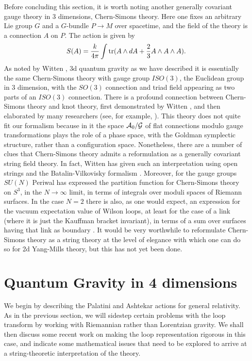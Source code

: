 \documentclass[12pt]{article}
\newcommand{\A}{{\cal A}}
\newcommand{\G}{{\cal G}}
\newcommand{\tr}{{\rm tr}}
\begin{document}
Before concluding this section,
it is worth noting another generally covariant gauge theory in 3 dimensions,
Chern-Simons theory.  Here one fixes an arbitrary Lie group $G$
and a $G$-bundle $P \to M$ over
spacetime, and the field of the theory
is a connection $A$ on $P$.  The action is given by
\[           S(A) = {k\over 4\pi}
 \int \tr(A \wedge dA + {2\over 3}A \wedge A \wedge A)  .\]
As noted by
Witten \cite{Witten2},  3d quantum gravity as we have described it is
essentially the same Chern-Simons theory with gauge group $ISO(3)$, the
Euclidean group in 3 dimension, with the $SO(3)$ connection and triad field
appearing as two parts of an $ISO(3)$ connection.  There is a profound
connection between Chern-Simons theory and knot theory, first demonstrated
by Witten \cite{Witten}, and then elaborated by many researchers (see, for
example, \cite{Atiyah}).  This theory does not quite fit our formalism
because in it the space $\A_0/\G$ of flat connections modulo gauge
transformations plays the role of a phase space, with the Goldman
symplectic structure, rather than a configuration space.  Nonetheless,
there are a number of clues that Chern-Simons theory admits a reformulation
as a generally covariant string field theory.   In fact, Witten has given
such an interpretation using open strings and the Batalin-Vilkovisky
formalism \cite{Witten3}.  Moreover, for the gauge groups $SU(N)$ Periwal
has expressed the partition function for Chern-Simons theory on $S^3$, in
the $N\to\infty$ limit, in terms of integrals over moduli spaces of Riemann
surfaces.  In the case $N = 2$ there is also, as one would expect, an
expression for the vacuum expectation value of Wilson loops, at least for
the case of a link (where it is just the Kauffman bracket invariant), in
terms of a sum over surfaces having that link as boundary \cite{Carter}.
It would be very worthwhile to reformulate Chern-Simons theory as a string
theory at the level of elegance with which one can do so for 2d Yang-Mills
theory, but this has not yet been done.

\section{Quantum Gravity in 4 dimensions}

We begin by describing the Palatini and Ashtekar actions for general
relativity.    As in the previous section, we will sidestep certain problems
with the loop transform by working with Riemannian rather than Lorentzian
gravity.   We shall then discuss some recent work on making the loop
representation rigorous in this case, and indicate some mathematical issues
that need to be explored to arrive at a string-theoretic interpretation of the
theory.
\end{document}
